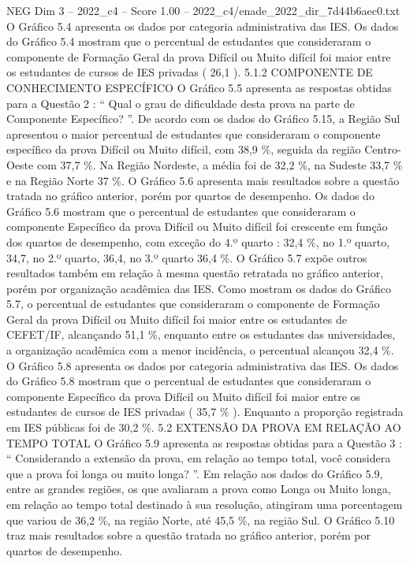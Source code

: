 \begin{textsample}{NEG Dim 3 – 2022\_c4 – Score 1.00 – 2022\_c4/enade\_2022\_dir\_7d44b6aec0.txt}
O Gráfico 5.4 apresenta os dados por categoria administrativa das IES.
Os dados do Gráfico 5.4 mostram que o percentual de estudantes que consideraram o componente de Formação Geral da prova Difícil ou Muito difícil foi maior entre os estudantes de cursos de IES privadas ( 26,1 ). 5.1.2 COMPONENTE DE CONHECIMENTO ESPECÍFICO O Gráfico 5.5 apresenta as respostas obtidas para a Questão 2 : “ Qual o grau de dificuldade desta prova na parte de Componente Específico? ”.
De acordo com os dados do Gráfico 5.15, a Região Sul apresentou o maior percentual de estudantes que consideraram o componente específico da prova Difícil ou Muito difícil, com 38,9 \%, seguida da região Centro-Oeste com 37,7 \%.
Na Região Nordeste, a média foi de 32,2 \%, na Sudeste 33,7 \% e na Região Norte 37 \%.
O Gráfico 5.6 apresenta mais resultados sobre a questão tratada no gráfico anterior, porém por quartos de desempenho.
Os dados do Gráfico 5.6 mostram que o percentual de estudantes que consideraram o componente Específico da prova Difícil ou Muito difícil foi crescente em função dos quartos de desempenho, com exceção do 4.º quarto : 32,4 \%, no 1.º quarto, 34,7, no 2.º quarto, 36,4, no 3.º quarto 36,4 \%.
O Gráfico 5.7 expõe outros resultados também em relação à mesma questão retratada no gráfico anterior, porém por organização acadêmica das IES.
Como mostram os dados do Gráfico 5.7, o percentual de estudantes que consideraram o componente de Formação Geral da prova Difícil ou Muito difícil foi maior entre os estudantes de CEFET/IF, alcançando 51,1 \%, enquanto entre os estudantes das universidades, a organização acadêmica com a menor incidência, o percentual alcançou 32,4 \%.
O Gráfico 5.8 apresenta os dados por categoria administrativa das IES.
Os dados do Gráfico 5.8 mostram que o percentual de estudantes que consideraram o componente Específico da prova Difícil ou Muito difícil foi maior entre os estudantes de cursos de IES privadas ( 35,7 \% ).
Enquanto a proporção registrada em IES públicas foi de 30,2 \%. 5.2 EXTENSÃO DA PROVA EM RELAÇÃO AO TEMPO TOTAL O Gráfico 5.9 apresenta as respostas obtidas para a Questão 3 : “ Considerando a extensão da prova, em relação ao tempo total, você considera que a prova foi longa ou muito longa? ”.
Em relação aos dados do Gráfico 5.9, entre as grandes regiões, os que avaliaram a prova como Longa ou Muito longa, em relação ao tempo total destinado à sua resolução, atingiram uma porcentagem que variou de 36,2 \%, na região Norte, até 45,5 \%, na região Sul.
O Gráfico 5.10 traz mais resultados sobre a questão tratada no gráfico anterior, porém por quartos de desempenho.

\end{textsample}
